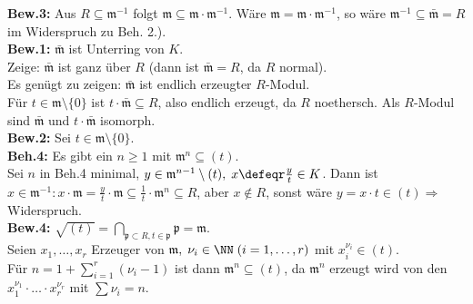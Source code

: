 \begin{Bew}
\textbf{Bew.3:} Aus $R \subseteq \mathfrak{m}^{-1}$ folgt $\mathfrak{m}
\subseteq \mathfrak{m} \cdot \mathfrak{m}^{-1}$. Wäre $\mathfrak{m} =
\mathfrak{m} \cdot \mathfrak{m}^{-1}$, so wäre $\mathfrak{m}^{-1} \subseteq
\bar{\mathfrak{m}} = R$ im Widerspruch zu Beh. 2.).\\
\textbf{Bew.1:} $\bar{\mathfrak{m}}$ ist Unterring von $K$.\\
Zeige: $\bar{\mathfrak{m}}$ ist ganz über $R$ (dann ist $\bar{\mathfrak{m}} =
R$, da $R$ normal).\\
Es genügt zu zeigen: $\bar{\mathfrak{m}}$ ist endlich erzeugter $R$-Modul.\\
Für $t \in \mathfrak{m} \setminus \{0\}$ ist $t \cdot \bar{\mathfrak{m}}
\subseteq R$, also endlich erzeugt, da $R$ noethersch.
Als $R$-Modul sind $\bar{\mathfrak{m}}$ und $t \cdot \bar{\mathfrak{m}}$
isomorph.\\
\textbf{Bew.2:} Sei $t \in \mathfrak{m} \setminus\{0\}$.\\
\textbf{Beh.4:} Es gibt ein $n \geq 1$ mit $\mathfrak{m}^n \subseteq (t)$.\\
Sei $n$ in Beh.4 minimal, $y \in \mathfrak{m}^{n-1} \setminus (t), \; x \defeqr
\frac{y}{t} \in K$.
Dann ist $x \in \mathfrak{m}^{-1}: x \cdot \mathfrak{m} = \frac{y}{t} \cdot
\mathfrak{m} \subseteq \frac{1}{t} \cdot \mathfrak{m}^n \subseteq R$, aber $x
\not\in R$, sonst wäre $y = x \cdot t \in (t) \Rightarrow$ Widerspruch.\\
\textbf{Bew.4:} $\sqrt{(t)} = \bigcap_{\mathfrak{p} \subset R, t \in
\mathfrak{p}} \mathfrak{p} = \mathfrak{m}$.\\
Seien $x_1, \dots, x_r$ Erzeuger von $\mathfrak{m}, \; \nu_i \in \NN
\;(i=1, \dots,r)$ mit $x_i^{\nu_i} \in (t)$.\\
Für $n = 1 + \sum_{i =1}^r(\nu_i -1)$ ist dann $\mathfrak{m}^n \subseteq (t)$,
da $\mathfrak{m}^n$ erzeugt wird von den $x_1^{\nu_1} \cdot \ldots \cdot
x_r^{\nu_r}$ mit $\sum \nu_i = n$.
\end{Bew}

